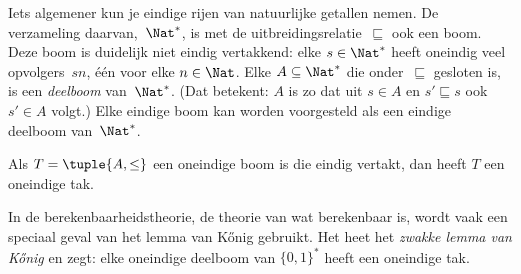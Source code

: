 \documentclass[../../../include/open-logic-section]{subfiles}
\begin{document}
\begin{ex}
Iets algemener kun je eindige rijen van natuurlijke getallen nemen.
De verzameling daarvan,~$\Nat^*$, is met de
uitbreidingsrelatie~$\sqsubseteq$ ook een boom. Deze boom is duidelijk
niet eindig vertakkend: elke $s \in \Nat^*$ heeft oneindig veel
opvolgers~$sn$, één voor elke $n \in \Nat$. Elke
$A \subseteq \Nat^*$ die onder~$\sqsubseteq$ gesloten is, is een
\emph{deelboom} van~$\Nat^*$. (Dat betekent: $A$ is zo dat uit
$s \in A$ en $s' \sqsubseteq s$ ook $s' \in A$ volgt.) Elke eindige
boom kan worden voorgesteld als een eindige deelboom van~$\Nat^*$.
\end{ex}

\begin{prop}
Als $T = \tuple{A,\le}$ een oneindige boom is die eindig vertakt, dan
heeft $T$ een oneindige tak.
\end{prop}

In de berekenbaarheidstheorie, de theorie van wat berekenbaar is, wordt
vaak een speciaal geval van het lemma van K\H{o}nig gebruikt. Het heet
het \emph{zwakke lemma van
K\H{o}nig} en zegt: elke oneindige deelboom van $\{0,1\}^*$ heeft een
oneindige tak.
\end{document}
